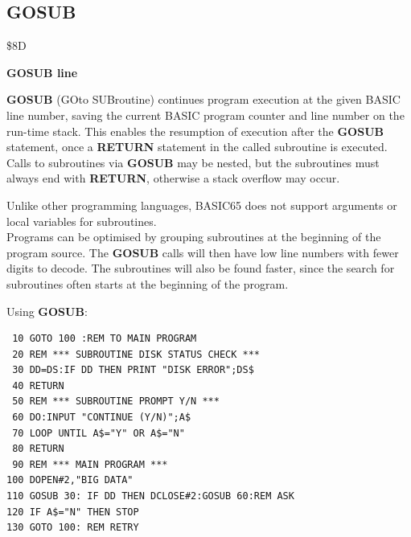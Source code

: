 
\newpage
\subsection{GOSUB}
\begin{description}[leftmargin=2cm,style=nextline]
\item [Token:] \$8D
\item [Format:] {\bf GOSUB line}
\item [Usage:] {\bf GOSUB} (GOto SUBroutine)
               continues program
               execution at the given BASIC line number,
               saving the current BASIC program counter
               and line number on the run-time stack.
               This enables the resumption of execution after
               the {\bf GOSUB} statement, once a {\bf RETURN}
               statement in the called subroutine is executed.
               Calls to subroutines via {\bf GOSUB} may be nested,
               but the subroutines must always end with
               {\bf RETURN}, otherwise a stack overflow
               may occur.

\item [Remarks:] Unlike other programming languages, BASIC65
               does not support arguments or local
               variables for subroutines. \\
               Programs can be optimised by grouping subroutines
               at the beginning of the program source. The
               {\bf GOSUB} calls will then have low line numbers
               with fewer digits to decode. The subroutines
               will also be found faster, since the search for subroutines
               often starts at the beginning of the program.
\item [Example:] Using {\bf GOSUB}:
\begin{tcolorbox}[colback=black,coltext=white]
\verbatimfont{\codefont}
\begin{verbatim}
 10 GOTO 100 :REM TO MAIN PROGRAM
 20 REM *** SUBROUTINE DISK STATUS CHECK ***
 30 DD=DS:IF DD THEN PRINT "DISK ERROR";DS$
 40 RETURN
 50 REM *** SUBROUTINE PROMPT Y/N ***
 60 DO:INPUT "CONTINUE (Y/N)";A$
 70 LOOP UNTIL A$="Y" OR A$="N"
 80 RETURN
 90 REM *** MAIN PROGRAM ***
100 DOPEN#2,"BIG DATA"
110 GOSUB 30: IF DD THEN DCLOSE#2:GOSUB 60:REM ASK
120 IF A$="N" THEN STOP
130 GOTO 100: REM RETRY
\end{verbatim}
\end{tcolorbox}
\end{description}

